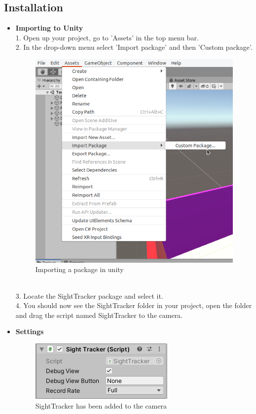 \documentclass[letterpaper]{article}
\begin{document}
\subsection{Installation}
\begin{itemize}
\item \textbf{Importing to Unity}\\
1. Open up your project, go to 'Assets' in the top menu bar.\\[0.15in]
2. In the drop-down menu select 'Import package' and then 'Custom package'.
\begin{figure}[h!]
  \centering \includegraphics[keepaspectratio,scale=0.8]{ImportPackage.png}
  \caption{Importing a package in unity}
  \label{fig:unityimport}
\end{figure}
\\3. Locate the SightTracker package and select it.\\[0.15in]
4. You should now see the SightTracker folder in your project, open the folder and drag the script named SightTracker to the camera.\\
\item \textbf{Settings}\\
\begin{figure}[h!]
  \centering \includegraphics[keepaspectratio,scale=0.9]{SightTracker.png}
  \caption{SightTracker has been added to the camera}
  \label{fig:loadedtocamera}
\end{figure}


\end{itemize}
\end{document}
